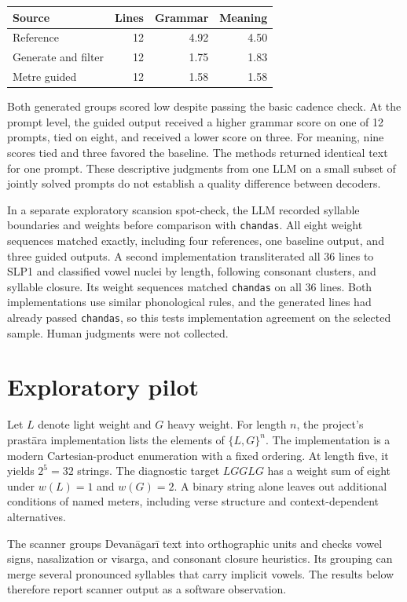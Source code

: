 \documentclass[11pt]{article}
\newcommand{\rtext}[1]{#1}
\begin{document}
\begin{center}
\small
\begin{tabular}{@{}lrrr@{}}
\toprule
Source & Lines & Grammar & Meaning\\
\midrule
Reference & 12 & 4.92 & 4.50\\
Generate and filter & 12 & 1.75 & 1.83\\
Metre guided & 12 & 1.58 & 1.58\\
\bottomrule
\end{tabular}
\end{center}
Both generated groups scored low despite passing the basic cadence check. At the prompt level, the guided output received a higher grammar score on one of 12 prompts, tied on eight, and received a lower score on three. For meaning, nine scores tied and three favored the baseline. The methods returned identical text for one prompt. These descriptive judgments from one LLM on a small subset of jointly solved prompts do not establish a quality difference between decoders.

In a separate exploratory scansion spot-check, the LLM recorded syllable boundaries and weights before comparison with \texttt{chandas}. All eight weight sequences matched exactly, including four references, one baseline output, and three guided outputs. A second implementation transliterated all 36 lines to SLP1 and classified vowel nuclei by length, following consonant clusters, and syllable closure. Its weight sequences matched \texttt{chandas} on all 36 lines. Both implementations use similar phonological rules, and the generated lines had already passed \texttt{chandas}, so this tests implementation agreement on the selected sample. Human judgments were not collected.

\section{Exploratory pilot}
Let \(L\) denote light weight and \(G\) heavy weight. For length \(n\), the project's \rtext{prastāra} implementation lists the elements of \(\{L,G\}^n\). The implementation is a modern Cartesian-product enumeration with a fixed ordering. At length five, it yields \(2^5=32\) strings. The diagnostic target \(LGGLG\) has a weight sum of eight under \(w(L)=1\) and \(w(G)=2\). A binary string alone leaves out additional conditions of named meters, including verse structure and context-dependent alternatives.

The scanner groups Devanāgarī text into orthographic units and checks vowel signs, nasalization or visarga, and consonant closure heuristics. Its grouping can merge several pronounced syllables that carry implicit vowels. The results below therefore report scanner output as a software observation.
\end{document}
